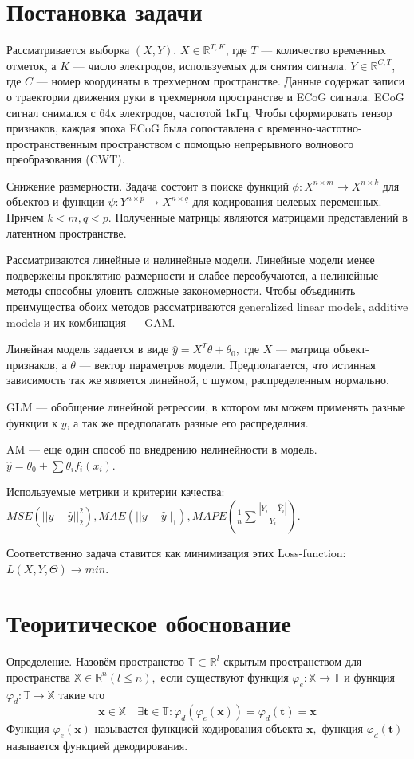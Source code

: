 \documentclass{article}
\begin{document}
\section{Постановка задачи}
Рассматривается выборка $(X, Y).$ $ X \in \mathds{R}^{T, K}$, где $T$ --- количество временных отметок, а $K$ ---  число электродов, используемых для снятия сигнала. $Y \in \mathds{R}^{C, T}$, где $C$ --- номер координаты в трехмерном пространстве. Данные содержат записи о траектории движения руки в трехмерном пространстве и ECoG сигнала. ECoG сигнал снимался с 64х электродов, частотой 1кГц. Чтобы сформировать тензор признаков, каждая эпоха ECoG была сопоставлена с временно-частотно-пространственным пространством с помощью непрерывного волнового преобразования (CWT). %
\par
Снижение размерности. Задача состоит в поиске функций $\phi: X^{n\times m} \rightarrow X^{n\times k}$ для объектов и функции  $\psi: Y^{n\times p} \rightarrow X^{n\times q}$ для кодирования целевых переменных. Причем $k < m, q < p.$ Полученные матрицы являются матрицами представлений в латентном пространстве.
\par
\par
Рассматриваются линейные и нелинейные модели. Линейные модели менее подвержены проклятию размерности и слабее переобучаются, а нелинейные методы способны уловить сложные закономерности. Чтобы объединить преимущества обоих методов рассматриваются generalized linear models, additive models и их комбинация --- GAM. \par
Линейная модель задается в виде $\hat y = X^T\theta + \theta_0,$ где $X$ --- матрица объект-признаков, а $\theta$ --- вектор параметров модели. Предполагается, что истинная зависимость так же является линейной, с шумом, распределенным нормально. \par
GLM --- обобщение линейной регрессии, в котором мы можем применять разные функции к $y$, а так же предполагать разные его распределния. \par
AM --- еще один способ по внедрению нелинейности в модель. $\hat y = \theta_0 + \sum \theta_i f_i(x_i)$. \par
Используемые метрики и критерии качества: $MSE(||y-\hat y||_2^2 ), MAE(||y-\hat y||_1), MAPE(\frac{1}{n}\sum \frac{|Y_i-\hat Y_i|}{Y_i})$.  \par
Соответственно задача ставится как минимизация этих Loss-function: $L(X, Y, \Theta) \rightarrow min.$

\section{Теоритическое обоснование}
Определение. Назовём пространство $\mathbb{T} \subset \mathbb{R}^{l}$ скрытым пространством
для пространства $\mathbb{X} \in \mathbb{R}^{n}(l \leqslant n),$ если существуют функция $\varphi_{e}: \mathbb{X} \rightarrow \mathbb{T}$ и
функция $\varphi_{d}: \mathbb{T} \rightarrow \mathbb{X}$ такие что
$$
\mathbf{x} \in \mathbb{X} \quad \exists \mathbf{t} \in \mathbb{T}: \varphi_{d}\left(\varphi_{e}(\mathbf{x})\right)=\varphi_{d}(\mathbf{t})=\mathbf{x}
$$
Функция $\varphi_{e}(\mathbf{x})$ называется функцией кодирования объекта $\mathbf{x},$ функция $\varphi_{d}(\mathbf{t})$
называется функцией декодирования.
\end{document}

